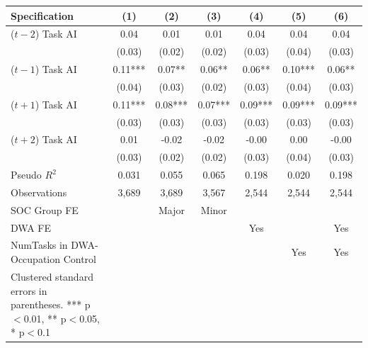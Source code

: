 \begin{tabular}{lcccccc}
\toprule
Specification & (1) & (2) & (3) & (4) & (5) & (6) \\
\midrule
($t-2$) Task AI & 0.04 & 0.01 & 0.01 & 0.04 & 0.04 & 0.04 \\
 & (0.03) & (0.02) & (0.02) & (0.03) & (0.04) & (0.03) \\
\addlinespace
($t-1$) Task AI & 0.11*** & 0.07** & 0.06** & 0.06** & 0.10*** & 0.06** \\
 & (0.04) & (0.03) & (0.02) & (0.03) & (0.04) & (0.03) \\
\addlinespace
($t+1$) Task AI & 0.11*** & 0.08*** & 0.07*** & 0.09*** & 0.09*** & 0.09*** \\
 & (0.03) & (0.03) & (0.03) & (0.03) & (0.03) & (0.03) \\
\addlinespace
($t+2$) Task AI & 0.01 & -0.02 & -0.02 & -0.00 & 0.00 & -0.00 \\
 & (0.03) & (0.02) & (0.02) & (0.03) & (0.04) & (0.03) \\
\addlinespace
\midrule
Pseudo $R^2$ & 0.031 & 0.055 & 0.065 & 0.198 & 0.020 & 0.198 \\
Observations & 3,689 & 3,689 & 3,567 & 2,544 & 2,544 & 2,544 \\
SOC Group FE &  & Major & Minor &  &  &  \\
DWA FE &  &  &  & Yes &  & Yes \\
NumTasks in DWA-Occupation Control &  &  &  &  & Yes & Yes \\
\bottomrule
\footnotesize{Clustered standard errors in parentheses. *** p$<$0.01, ** p$<$0.05, * p$<$0.1}
\end{tabular}
